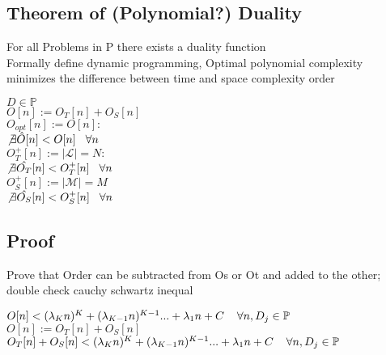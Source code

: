 \documentclass[11pt]{article}
\begin{document}
\subsection{Theorem of (Polynomial?) Duality}
For all Problems in P there exists a duality function\\
Formally define dynamic programming, Optimal polynomial complexity minimizes the difference between time and space complexity order
\begin{center}
\vspace{2mm}
$
D \in \mathbb{P}
$
\\ \vspace{2mm}
$
O[n] := O_T[n] + O_S[n]
$
\\ \vspace{2mm}
$
O_{opt}[n] := O[n] :
$
\\ \vspace{2mm}
$
\not \exists \hat{O} \lbrack n \rbrack < O[n] \hspace{3mm} \forall n
$
\\ \vspace{6mm}
$
O_T^+[n] := |\mathcal{L}| = N :
$
\\ \vspace{2mm}
$
\not \exists \hat{O_T} \lbrack n \rbrack < O^+_{T}[n] \hspace{3mm} \forall n
$
\\ \vspace{2mm}
$
O_S^+[n] := |\mathcal{M}| = M
$
\\ \vspace{2mm}
$
\not \exists \hat{O_S} \lbrack n \rbrack < O^+_{S}[n] \hspace{3mm} \forall n
$
\end{center}







\subsection{Proof}
Prove that Order can be subtracted from Os or Ot and added to the other; double check cauchy schwartz inequal
\begin{center}
$
O[n] < (\lambda_K n)^K + (\lambda_{K-1} n)^{K-1}... + \lambda_1 n + C \hspace{4mm} \forall n, D_j \in \mathbb{P}
$
\\ \vspace{2mm}
$
O[n] := O_T[n] + O_S[n]
$
\\ \vspace{2mm}
$
O_T[n] + O_S[n] < (\lambda_K n)^K + (\lambda_{K-1} n)^{K-1}... + \lambda_1 n + C \hspace{4mm} \forall n, D_j \in \mathbb{P}
$
\end{center}
\end{document}
